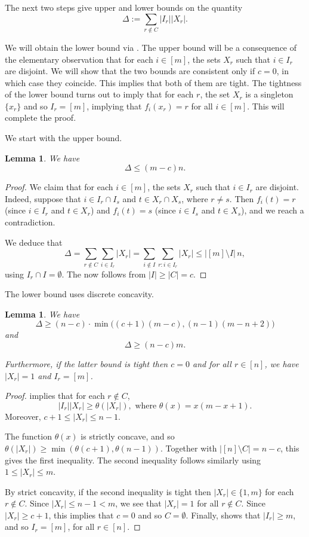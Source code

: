 \documentclass{article}
\newtheorem{lemma}[theorem]{Lemma}
\theoremstyle{definition}
\theoremstyle{remark}
\begin{document}
The next two steps give upper and lower bounds on the quantity
\[
 \Delta := \sum_{r \notin C} |I_r| |X_r|.
\]

We will obtain the lower bound via .
The upper bound will be a consequence of the elementary observation that for each $i \in [m]$, the sets $X_r$ such that $i \in I_r$ are disjoint.
We will show that the two bounds are consistent only if $c = 0$, in which case they coincide. This implies that both of them are tight. The tightness of the lower bound turns out to imply that for each $r$, the set $X_r$ is a singleton $\{x_r\}$ and so $I_r = [m]$, implying that $f_i(x_r) = r$ for all $i \in [m]$. This will complete the proof. 

We start with the upper bound.

\begin{lemma}
\label{lem:Delta-ub}
We have
\[
 \Delta \leq (m-c)n.
\]
\end{lemma}
\begin{proof}
We claim that for each $i \in [m]$, the sets $X_r$ such that $i \in I_r$ are disjoint. Indeed, suppose that $i \in I_r \cap I_s$ and $t \in X_r \cap X_s$, where $r \neq s$. Then $f_i(t) = r$ (since $i \in I_r$ and $t \in X_r$) and $f_i(t) = s$ (since $i \in I_s$ and $t \in X_s$), and we reach a contradiction.

We deduce that
\[
 \Delta = \sum_{r \notin C} \sum_{i \in I_r} |X_r| = \sum_{i \notin I} \sum_{r\colon i \in I_r} |X_r| \leq |[m] \setminus I| \, n,
\]
using $I_r \cap I = \emptyset$. The  now follows from $|I| \geq |C| = c$.
\end{proof}

The lower bound uses discrete concavity.

\begin{lemma}
\label{lem:Delta-lb}
We have
\[
 \Delta \ge (n-c) \cdot \min\bigl((c+1)(m-c), (n-1)(m-n+2)\bigr)
\]
and
\[
 \Delta \ge (n-c)m.
\]

Furthermore, if the latter bound is tight then $c = 0$ and for all $r \in [n]$, we have $|X_r| = 1$ and $I_r = [m]$.
\end{lemma}
\begin{proof}
 implies that for each $r \notin C$,
\[
 |I_r| |X_r| \ge \theta(|X_r|), \text{ where } \theta(x) = x(m-x+1).
\]
Moreover, $c + 1 \leq |X_r| \leq n - 1$.

The function $\theta(x)$ is strictly concave, and so $\theta(|X_r|) \geq \min(\theta(c+1), \theta(n-1))$. Together with $|[n] \setminus C| = n-c$, this gives the first inequality.
The second inequality follows similarly using $1 \leq |X_r| \leq m$.

By strict concavity, if the second inequality is tight then $|X_r| \in \{1,m\}$ for each $r \notin C$. Since $|X_r| \leq n - 1 < m$, we see that $|X_r| = 1$ for all $r \notin C$. Since $|X_r| \ge c + 1$, this implies that $c = 0$ and so $C = \emptyset$. Finally,  shows that $|I_r| \ge m$, and so $I_r = [m]$, for all $r \in [n]$.
\end{proof}
\end{document}
